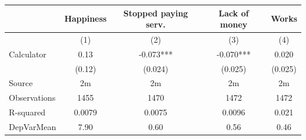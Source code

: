 \begin{tabular}{lcccc}
\toprule
      & Happiness & Stopped paying serv.  & Lack of money & Works \\
\midrule
      & (1)   & (2)   & (3)   & (4) \\
Calculator & 0.13  & -0.073*** & -0.070*** & 0.020 \\
      & (0.12) & (0.024) & (0.025) & (0.025) \\
\midrule
Source & 2m    & 2m    & 2m    & 2m \\
Observations & 1455  & 1470  & 1472  & 1472 \\
R-squared & 0.0079 & 0.0075 & 0.0096 & 0.021 \\
DepVarMean & 7.90  & 0.60  & 0.56  & 0.46 \\
\bottomrule
\bottomrule
\end{tabular}%
